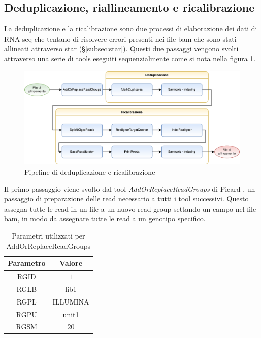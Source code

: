 	\subsection{Deduplicazione, riallineamento e ricalibrazione}
        \label{subsec:deduprecal}
	La deduplicazione e la ricalibrazione sono due processi di elaborazione dei dati di RNA-seq che tentano di risolvere errori presenti nei file bam che sono stati allineati attraverso star (\S\ref{subsec:star}).
  Questi due passaggi vengono svolti attraverso una serie di tools eseguiti sequenzialmente come si nota nella figura \ref{fig:pipeline_deduprecal}.
  \begin{figure}[H]
    \centering
    \includegraphics[scale=0.17]{deduprecal.png}
    \caption{Pipeline di deduplicazione e ricalibrazione}
    \label{fig:pipeline_deduprecal}
  \end{figure}
  Il primo passaggio viene svolto dal tool \emph{AddOrReplaceReadGroups} \cite{addorreplacegroup} di Picard \cite{picard}, un passaggio di preparazione delle read necessario a tutti i tool successivi.
  Questo assegna tutte le read in un file a un nuovo read-group settando un campo nel file bam, in modo da assegnare tutte le read a un genotipo specifico.
  \begin{table}[H]
        \centering
        \begin{tabular}{|c|c|}
                \hline
                Parametro & Valore\\
                \hline
                RGID & $1$\\
                \hline
                RGLB & lib1\\
                \hline
                RGPL & ILLUMINA\\
                \hline
                RGPU & unit1\\
                \hline
                RGSM & $20$\\
                \hline
         \end{tabular}
         \caption{Parametri utilizzati per AddOrReplaceReadGroups}
    \end{table}

